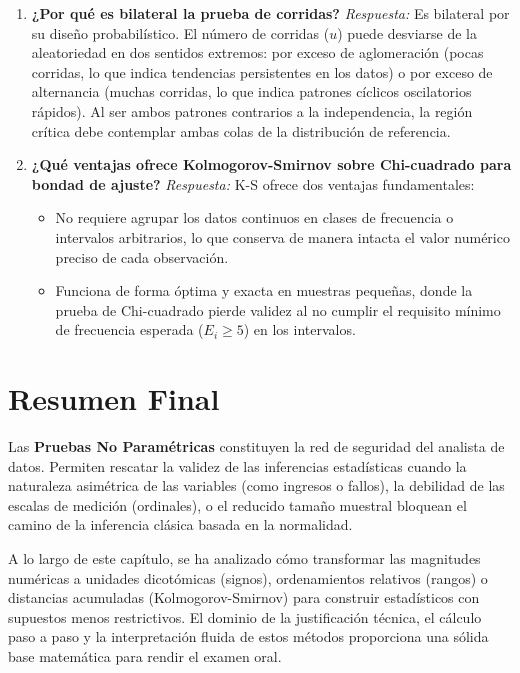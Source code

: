 \documentclass[11pt,a4paper]{article}
\begin{document}
\begin{enumerate}
    \item \textbf{¿Por qué es bilateral la prueba de corridas?}
    \textit{Respuesta:} Es bilateral por su diseño probabilístico. El número de corridas ($u$) puede desviarse de la aleatoriedad en dos sentidos extremos: por exceso de aglomeración (pocas corridas, lo que indica tendencias persistentes en los datos) o por exceso de alternancia (muchas corridas, lo que indica patrones cíclicos oscilatorios rápidos). Al ser ambos patrones contrarios a la independencia, la región crítica debe contemplar ambas colas de la distribución de referencia.

    \item \textbf{¿Qué ventajas ofrece Kolmogorov-Smirnov sobre Chi-cuadrado para bondad de ajuste?}
    \textit{Respuesta:} K-S ofrece dos ventajas fundamentales:
    \begin{itemize}
        \item No requiere agrupar los datos continuos en clases de frecuencia o intervalos arbitrarios, lo que conserva de manera intacta el valor numérico preciso de cada observación.
        \item Funciona de forma óptima y exacta en muestras pequeñas, donde la prueba de Chi-cuadrado pierde validez al no cumplir el requisito mínimo de frecuencia esperada ($E_i \ge 5$) en los intervalos.
    \end{itemize}
\end{enumerate}

\newpage
\section{Resumen Final}

\begin{tcolorbox}[colback=blue!5!white,colframe=blue!50!black,title=Síntesis para el Examen]
    Las \textbf{Pruebas No Paramétricas} constituyen la red de seguridad del analista de datos. Permiten rescatar la validez de las inferencias estadísticas cuando la naturaleza asimétrica de las variables (como ingresos o fallos), la debilidad de las escalas de medición (ordinales), o el reducido tamaño muestral bloquean el camino de la inferencia clásica basada en la normalidad. 
    
    A lo largo de este capítulo, se ha analizado cómo transformar las magnitudes numéricas a unidades dicotómicas (signos), ordenamientos relativos (rangos) o distancias acumuladas (Kolmogorov-Smirnov) para construir estadísticos con supuestos menos restrictivos. El dominio de la justificación técnica, el cálculo paso a paso y la interpretación fluida de estos métodos proporciona una sólida base matemática para rendir el examen oral.
\end{tcolorbox}
\end{document}
